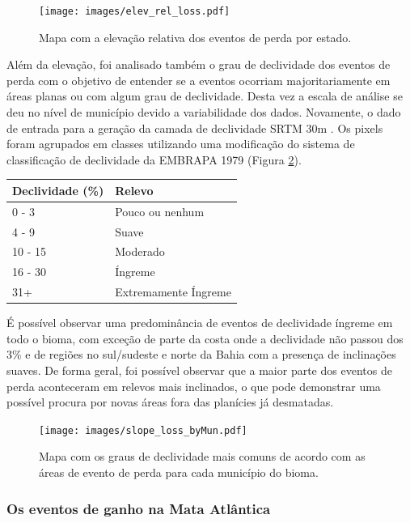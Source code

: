 \begin{figure}[H]
    \centering
    \texttt{[image: images/elev\_rel\_loss.pdf]}
    \caption{Mapa com a elevação relativa dos eventos de perda por estado.}
    \label{fig:elev_rel_loss}
\end{figure}

Além da elevação, foi analisado também o grau de declividade dos eventos de perda com o objetivo de entender se a eventos ocorriam majoritariamente em áreas planas ou com algum grau de declividade. Desta vez a escala de análise se deu no nível de município devido a variabilidade dos dados. Novamente, o dado de entrada para a geração da camada de declividade SRTM 30m \citep{srtm30m}. Os pixels foram agrupados em classes utilizando uma modificação do sistema de classificação de declividade da EMBRAPA 1979 \citep{Embrapaslope} (Figura \ref{fig:slope_loss_byMun}). 

\begin{center}
    \begin{tabular}{ | l | l | }
    \hline
    Declividade (\%) & Relevo \\ \hline
    0 - 3 & Pouco ou nenhum \\ \hline
    4 - 9 & Suave \\ \hline
    10 - 15 & Moderado \\ \hline
    16 - 30 & Íngreme \\ \hline
    31+ & Extremamente Íngreme \\ 
    \hline
    \end{tabular}
\end{center}

É possível observar uma predominância de eventos de declividade íngreme em todo o bioma, com exceção de parte da costa onde a declividade não passou dos 3\% e de regiões no sul/sudeste e norte da Bahia com a presença de inclinações suaves. De forma geral, foi possível observar que a maior parte dos eventos de perda aconteceram em relevos mais inclinados, o que pode demonstrar uma possível procura por novas áreas fora das planícies já desmatadas. 

\begin{figure}[H]
    \centering
    \texttt{[image: images/slope\_loss\_byMun.pdf]}
    \caption{Mapa com os graus de declividade mais comuns de acordo com as áreas de evento de perda para cada município do bioma.}
    \label{fig:slope_loss_byMun}
\end{figure}

\subsubsection{Os eventos de ganho na Mata Atlântica}

